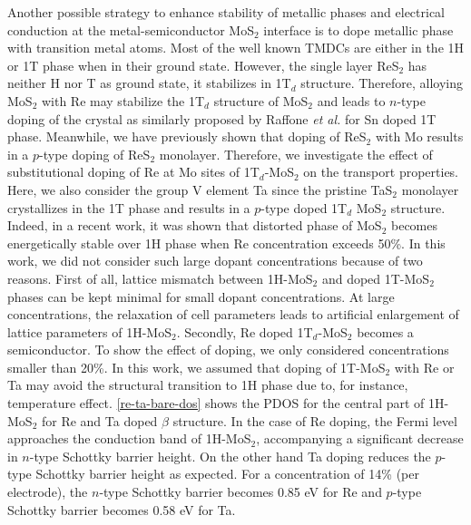 Another possible strategy to enhance stability of metallic phases and electrical conduction at the metal-semiconductor MoS$_2$ interface is to dope metallic phase with transition metal atoms. Most of the well known TMDCs are either in the 1H or 1T phase when in their ground state. However, the single layer ReS$_2$ has neither H nor T as ground state, it stabilizes in 1T$_d$ structure\cite{tongay-res2,res2-cakir}. Therefore, alloying MoS$_2$ with Re may stabilize the 1T$_d$ structure of MoS$_{2}$ and leads to $n$-type doping of the crystal as similarly proposed by Raffone \textit{et al.} for Sn doped 1T phase\cite{Raffone}.  Meanwhile, we have previously shown that doping of ReS$_2$ with Mo results in a $p$-type doping of ReS$_2$ monolayer\cite{res2-cakir}. Therefore, we investigate the effect of substitutional doping of Re at Mo sites of 1T$_d$-MoS$_2$ on the transport properties. Here, we also consider the group V element Ta since the pristine TaS$_2$ monolayer crystallizes in the 1T phase and results in  a $p$-type doped 1T$_d$ MoS$_{2}$ structure. Indeed, in a recent work, it was shown that distorted phase of MoS$_2$ becomes energetically stable over 1H phase when Re concentration exceeds 50\%\cite{doi:10.1021/acs.jpcc.5b10739}. In this work, we did not consider such large dopant concentrations because of two reasons. First of all, lattice mismatch between 1H-MoS$_2$ and doped 1T-MoS$_2$ phases can be kept minimal for small dopant concentrations. At large concentrations, the relaxation of cell parameters leads to artificial enlargement of lattice parameters of  1H-MoS$_2$.  Secondly, Re doped 1T$_d$-MoS$_2$ becomes a semiconductor. To show the effect of doping, we only considered concentrations smaller than 20\%.  In this work, we assumed that doping of 1T-MoS$_2$ with Re or Ta may avoid the structural transition to 1H phase due to, for instance, temperature effect. \autoref{re-ta-bare-dos} shows the PDOS for the central part of 1H-MoS$_2$ for Re and Ta doped $\beta$ structure. In the case of Re doping, the Fermi level approaches the conduction band of 1H-MoS$_2$, accompanying a significant decrease in $n$-type Schottky barrier height. On the other hand Ta doping reduces the $p$-type Schottky barrier height as expected. For a concentration of 14\% (per electrode), the $n$-type Schottky barrier becomes 0.85 eV for Re and $p$-type Schottky barrier becomes 0.58 eV for Ta.

